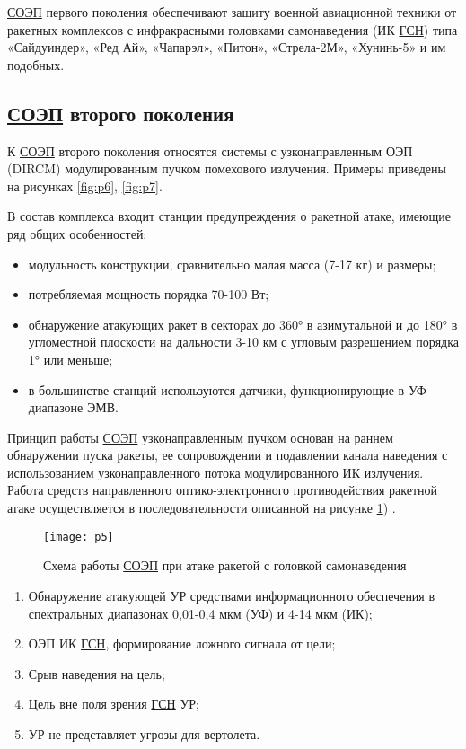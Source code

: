  \hyperref[acroSOEP]{СОЭП} первого поколения обеспечивают защиту военной авиационной техники от ракетных комплексов с инфракрасными головками самонаведения (ИК \hyperref[acroGSN]{ГСН}) типа «Сайдуиндер», «Ред Ай», «Чапарэл», «Питон», «Стрела-2М», «Хунинь-5» и им подобных. 

\subsection{ \hyperref[acroSOEP]{СОЭП} второго поколения}	

К  \hyperref[acroSOEP]{СОЭП} второго поколения относятся системы с узконаправленным ОЭП (DIRCM) модулированным пучком помехового излучения. Примеры приведены на рисунках \ref{fig:p6}, \ref{fig:p7}.

В состав комплекса входит станции предупреждения о ракетной атаке, имеющие ряд общих особенностей:
\begin{itemize}
	\item модульность конструкции, сравнительно малая масса (7-17 кг) и размеры;
	\item потребляемая мощность порядка 70-100 Вт;
	\item обнаружение атакующих ракет в секторах до 360° в азимутальной и до 180° в угломестной плоскости на дальности 3-10 км с угловым разрешением порядка 1° или меньше;
	\item в большинстве станций используются датчики, функционирующие в УФ-диапазоне ЭМВ.
\end{itemize}

Принцип работы  \hyperref[acroSOEP]{СОЭП} узконаправленным пучком основан на раннем обнаружении пуска ракеты, ее сопровождении и подавлении канала наведения с использованием узконаправленного потока модулированного ИК излучения. Работа средств направленного оптико-электронного противодействия ракетной атаке осуществляется в последовательности описанной на рисунке \ref{fig:p5}) \cite[]{ForeignMilitary}.

\begin{figure}[ht]
	\centering
	\texttt{[image: p5]} 
	\caption{Схема работы  \hyperref[acroSOEP]{СОЭП} при атаке ракетой с головкой самонаведения}
	\label{fig:p5}
\end{figure}

\begin{enumerate}
	\item Обнаружение атакующей УР средствами информационного обеспечения в спектральных диапазонах 0,01-0,4 мкм (УФ) и 4-14 мкм (ИК);
	\item ОЭП ИК \hyperref[acroGSN]{ГСН}, формирование ложного сигнала от цели; 
	\item Срыв наведения на цель; 
	\item Цель вне поля зрения \hyperref[acroGSN]{ГСН} УР; 
	\item УР не представляет угрозы для вертолета.	
\end{enumerate}

